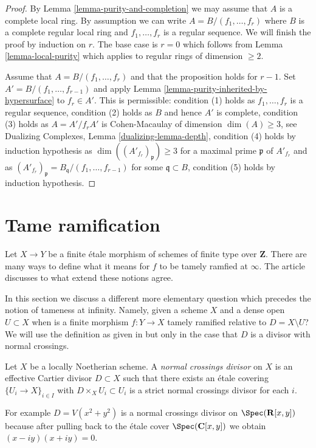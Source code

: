 \begin{proof}
By Lemma \ref{lemma-purity-and-completion} we may assume that $A$ is
a complete local ring. By assumption we can write
$A = B/(f_1, \ldots, f_r)$ where $B$ is a complete regular local
ring and $f_1, \ldots, f_r$ is a regular sequence.
We will finish the proof by induction on $r$.
The base case is $r = 0$ which follows from
Lemma \ref{lemma-local-purity} which applies to
regular rings of dimension $\geq 2$.

\medskip\noindent
Assume that $A = B/(f_1, \ldots, f_r)$ and that the proposition
holds for $r - 1$. Set $A' = B/(f_1, \ldots, f_{r - 1})$ and apply
Lemma \ref{lemma-purity-inherited-by-hypersurface} to $f_r \in A'$.
This is permissible:
condition (1) holds as $f_1, \ldots, f_r$ is a regular sequence,
condition (2) holds as $B$ and hence $A'$ is complete,
condition (3) holds as $A = A'/f_r A'$ is Cohen-Macaulay of dimension
$\dim(A) \geq 3$, see Dualizing Complexes, Lemma \ref{dualizing-lemma-depth},
condition (4) holds by induction hypothesis as
$\dim((A'_{f_r})_\mathfrak p) \geq 3$ for a maximal
prime $\mathfrak p$ of $A'_{f_r}$ and as
$(A'_{f_r})_\mathfrak p = B_\mathfrak q/(f_1, \ldots, f_{r - 1})$
for some $\mathfrak q \subset B$,
condition (5) holds by induction hypothesis.
\end{proof}








\section{Tame ramification}
\label{section-tame}

\noindent
Let $X \to Y$ be a finite \'etale morphism of schemes of finite type
over $\mathbf{Z}$. There are many ways to define what it means for $f$
to be tamely ramfied at $\infty$. The article \cite{Kerz-Schmidt}
discusses to what extend these notions agree.

\medskip\noindent
In this section we discuss a different more elementary question which
precedes the notion of tameness at infinity. Namely, given a scheme
$X$ and a dense open $U \subset X$ when is a finite  morphism $f : Y \to X$
tamely ramified relative to $D = X \setminus U$? We will use the definition
as given in \cite{Grothendieck-Murre} but only in the case that $D$ is
a divisor with normal crossings.

\begin{definition}
\label{definition-normal-crossings}
Let $X$ be a locally Noetherian scheme. A {\it normal crossings divisor}
on $X$ is an effective Cartier divisor $D \subset X$ such that there
exists an \'etale covering $\{U_i \to X\}_{i \in I}$ with
$D \times_X U_i \subset U_i$ is a strict normal crossings divisor
for each $i$.
\end{definition}

\noindent
For example $D = V(x^2 + y^2)$ is a normal crossings divisor on
$\Spec(\mathbf{R}[x, y])$ because after pulling back to
the \'etale cover $\Spec(\mathbf{C}[x, y])$ we obtain $(x - iy)(x + iy) = 0$.




















